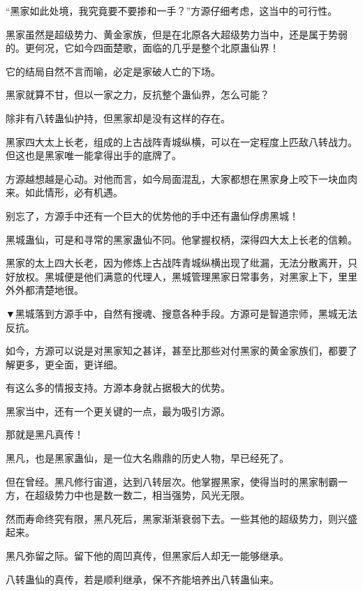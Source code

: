 
\begin{this_body}



“黑家如此处境，我究竟要不要掺和一手？”方源仔细考虑，这当中的可行性。

黑家虽然是超级势力、黄金家族，但是在北原各大超级势力当中，还是属于势弱的。更何况，它如今四面楚歌，面临的几乎是整个北原蛊仙界！

它的结局自然不言而喻，必定是家破人亡的下场。

黑家就算不甘，但以一家之力，反抗整个蛊仙界，怎么可能？

除非有八转蛊仙护持，但黑家却是没有这样的存在。

黑家四大太上长老，组成的上古战阵青城纵横，可以在一定程度上匹敌八转战力。但这也是黑家唯一能拿得出手的底牌了。

方源越想越是心动。对他而言，如今局面混乱，大家都想在黑家身上咬下一块血肉来。如此情形，必有机遇。

别忘了，方源手中还有一个巨大的优势他的手中还有蛊仙俘虏黑城！

黑城蛊仙，可是和寻常的黑家蛊仙不同。他掌握权柄，深得四大太上长老的信赖。

黑家的太上四大长老，因为修炼上古战阵青城纵横出现了纰漏，无法分散离开，只好放权。黑城便是他们满意的代理人，黑城管理黑家日常事务，对黑家上下，里里外外都清楚地很。

▼黑城落到方源手中，自然有搜魂、搜意各种手段。方源可是智道宗师，黑城无法反抗。

如今，方源可以说是对黑家知之甚详，甚至比那些对付黑家的黄金家族们，都要了解更多，更全面，更详细。

有这么多的情报支持。方源本身就占据极大的优势。

黑家当中，还有一个更关键的一点，最为吸引方源。

那就是黑凡真传！

黑凡，也是黑家蛊仙，是一位大名鼎鼎的历史人物，早已经死了。

但在曾经。黑凡修行宙道，达到八转层次。他掌握黑家，使得当时的黑家制霸一方，在超级势力中也是数一数二，相当强势，风光无限。

然而寿命终究有限，黑凡死后，黑家渐渐衰弱下去。一些其他的超级势力，则兴盛起来。

黑凡弥留之际。留下他的周凹真传，但黑家后人却无一能够继承。

八转蛊仙的真传，若是顺利继承，保不齐能培养出八转蛊仙来。


\end{this_body}
